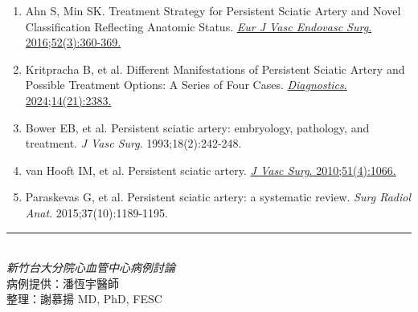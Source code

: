 \documentclass[12pt,a4paper]{article}
\begin{document}
\begin{enumerate}
    \item Ahn S, Min SK. Treatment Strategy for Persistent Sciatic Artery and Novel Classification Reflecting Anatomic Status. \href{https://doi.org/10.1016/j.ejvs.2016.05.025}{\textit{Eur J Vasc Endovasc Surg}. 2016;52(3):360-369.}

    \item Kritpracha B, et al. Different Manifestations of Persistent Sciatic Artery and Possible Treatment Options: A Series of Four Cases. \href{https://doi.org/10.3390/diagnostics14212383}{\textit{Diagnostics}. 2024;14(21):2383.}

    \item Bower EB, et al. Persistent sciatic artery: embryology, pathology, and treatment. \textit{J Vasc Surg}. 1993;18(2):242-248.

    \item van Hooft IM, et al. Persistent sciatic artery. \href{https://doi.org/10.1016/j.jvs.2009.07.116}{\textit{J Vasc Surg}. 2010;51(4):1066.}

    \item Paraskevas G, et al. Persistent sciatic artery: a systematic review. \textit{Surg Radiol Anat}. 2015;37(10):1189-1195.
\end{enumerate}

\vspace{1cm}
\begin{center}
\textcolor{emergency_gray}{\rule{0.8\textwidth}{0.5pt}}\\[0.3cm]
\textit{新竹台大分院心血管中心病例討論}\\
病例提供：潘恆宇醫師\\
整理：謝慕揚 MD, PhD, FESC
\end{center}
\end{document}
